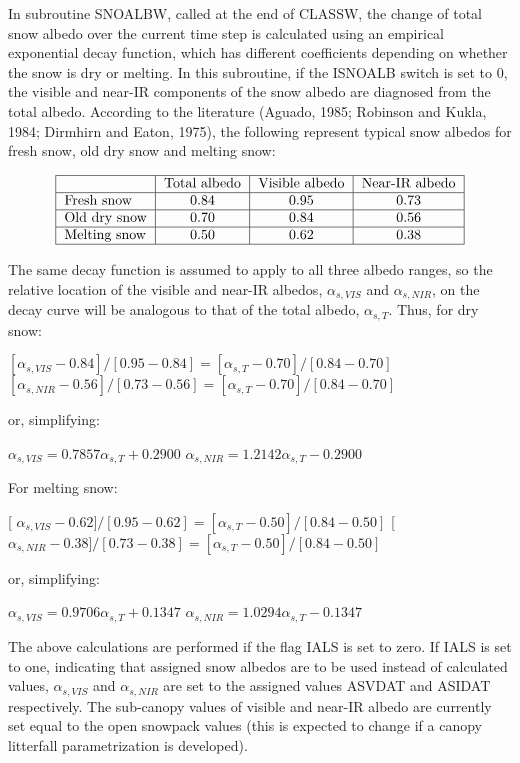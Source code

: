 In subroutine S\+N\+O\+A\+L\+B\+W, called at the end of C\+L\+A\+S\+S\+W, the change of total snow albedo over the current time step is calculated using an empirical exponential decay function, which has different coefficients depending on whether the snow is dry or melting. In this subroutine, if the I\+S\+N\+O\+A\+L\+B switch is set to 0, the visible and near-\/\+I\+R components of the snow albedo are diagnosed from the total albedo. According to the literature (Aguado, 1985; Robinson and Kukla, 1984; Dirmhirn and Eaton, 1975), the following represent typical snow albedos for fresh snow, old dry snow and melting snow\+:

\[ \begin{tabular} { | l | c | c | c | } \hline & Total albedo & Visible albedo & Near-IR albedo \\ \hline Fresh snow & 0.84 & 0.95 & 0.73 \\ \hline Old dry snow & 0.70 & 0.84 & 0.56 \\ \hline Melting snow & 0.50 & 0.62 & 0.38 \\ \hline \end{tabular} \]

The same decay function is assumed to apply to all three albedo ranges, so the relative location of the visible and near-\/\+I\+R albedos, $\alpha_{s,VIS}$ and $\alpha_{s,NIR}$, on the decay curve will be analogous to that of the total albedo, $\alpha_{s,T}$. Thus, for dry snow\+:

$[\alpha_{s,VIS} - 0.84]/[0.95-0.84] = [\alpha_{s,T} - 0.70]/[0.84-0.70]$ $[\alpha_{s,NIR} - 0.56]/[0.73-0.56] = [\alpha_{s,T} - 0.70]/[0.84-0.70]$

or, simplifying\+:

$\alpha_{s,VIS} = 0.7857 \alpha_{s,T} + 0.2900$ $\alpha_{s,NIR} = 1.2142 \alpha_{s,T} - 0.2900$

For melting snow\+:

\mbox{[} $\alpha_{s,VIS} - 0.62]/[0.95-0.62] = [\alpha_{s,T} - 0.50]/[0.84-0.50]$ \mbox{[} $\alpha_{s,NIR} - 0.38]/[0.73-0.38] = [\alpha_{s,T} - 0.50]/[0.84-0.50]$

or, simplifying\+:

$\alpha_{s,VIS} = 0.9706 \alpha_{s,T} + 0.1347$ $\alpha_{s,NIR} = 1.0294 \alpha_{s,T} - 0.1347$

The above calculations are performed if the flag I\+A\+L\+S is set to zero. If I\+A\+L\+S is set to one, indicating that assigned snow albedos are to be used instead of calculated values, $\alpha_{s,VIS}$ and $\alpha_{s,NIR}$ are set to the assigned values A\+S\+V\+D\+A\+T and A\+S\+I\+D\+A\+T respectively. The sub-\/canopy values of visible and near-\/\+I\+R albedo are currently set equal to the open snowpack values (this is expected to change if a canopy litterfall parametrization is developed).

